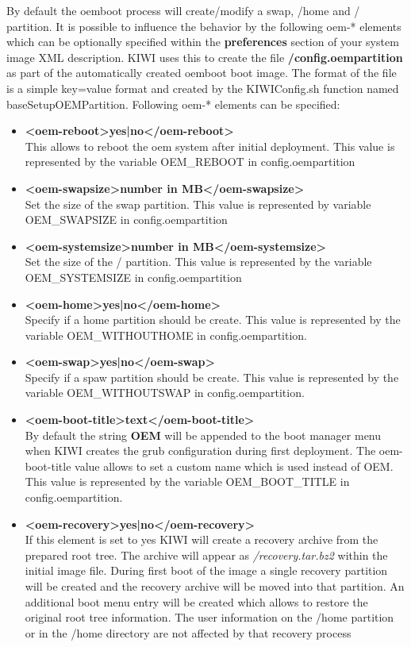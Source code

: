 By default the oemboot process will create/modify a swap, /home and /
partition. It is possible to influence the behavior by the following
oem-* elements which can be optionally specified within the
\textbf{preferences} section of your system image XML description.
KIWI uses this to create the file \textbf{/config.oempartition} as part
of the automatically created oemboot boot image. The format of the
file is a simple key=value format and created by the KIWIConfig.sh
function named baseSetupOEMPartition. Following oem-* elements can
be specified:

\begin{itemize}
\item \textbf{<oem-reboot>yes|no</oem-reboot>}\\
      This allows to reboot the oem system after initial deployment.
      This value is represented by the variable OEM\_REBOOT in
      config.oempartition
\item \textbf{<oem-swapsize>number in MB</oem-swapsize>}\\
      Set the size of the swap partition. This value is represented by
      variable OEM\_SWAPSIZE in config.oempartition
\item \textbf{<oem-systemsize>number in MB</oem-systemsize>}\\
      Set the size of the / partition. This value is represented by the
      variable OEM\_SYSTEMSIZE in config.oempartition
\item \textbf{<oem-home>yes|no</oem-home>}\\
      Specify if a home partition should be create. This value is represented
      by the variable OEM\_WITHOUTHOME in config.oempartition.
\item \textbf{<oem-swap>yes|no</oem-swap>}\\
      Specify if a spaw partition should be create. This value is represented 
      by the variable OEM\_WITHOUTSWAP in config.oempartition.
\item \textbf{<oem-boot-title>text</oem-boot-title>}\\
      By default the string \textbf{OEM} will be appended to the
      boot manager menu when KIWI creates the grub configuration during
      first deployment. The oem-boot-title value allows to set a custom
      name which is used instead of OEM. This value is represented
      by the variable OEM\_BOOT\_TITLE in config.oempartition.
\item \textbf{<oem-recovery>yes|no</oem-recovery>}\\
      If this element is set to yes KIWI will create a recovery archive
      from the prepared root tree. The archive will appear as
      \textit{/recovery.tar.bz2} within the initial image file. During
      first boot of the image a single recovery partition will be
      created and the recovery archive will be moved into that
      partition. An additional boot menu entry will be created which
      allows to restore the original root tree information. The
      user information on the /home partition or in the /home directory
      are not affected by that recovery process
\end{itemize}

